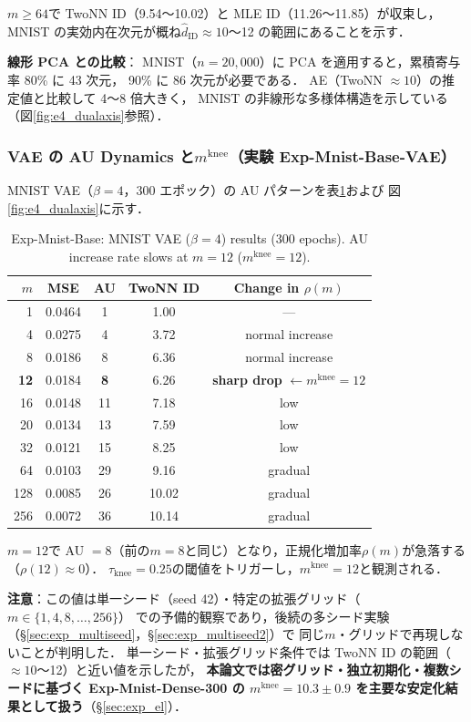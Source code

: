 \documentclass[11pt,a4paper]{jsarticle}
\newcommand{\mknee}{m^{\mathrm{knee}}}
\begin{document}
$m \geq 64$で TwoNN ID（9.54〜10.02）と MLE ID（11.26〜11.85）が収束し，
MNIST の実効内在次元が概ね$\hat{d}_\mathrm{ID} \approx 10$〜12 の範囲にあることを示す．

\textbf{線形 PCA との比較}：
MNIST（$n = 20{,}000$）に PCA を適用すると，累積寄与率 80\% に 43 次元，
90\% に 86 次元が必要である．
AE（TwoNN $\approx 10$）の推定値と比較して 4〜8 倍大きく，
MNIST の非線形な多様体構造を示している（図\ref{fig:e4_dualaxis}参照）．

\subsubsection{VAE の AU Dynamics と$\mknee$（実験 Exp-Mnist-Base-VAE）}

MNIST VAE（$\beta = 4$，300 エポック）の AU パターンを表\ref{tab:e4_vae}および
図\ref{fig:e4_dualaxis}に示す．

\begin{table}[H]
\centering
\caption{Exp-Mnist-Base: MNIST VAE ($\beta=4$) results (300 epochs). AU increase rate slows at $m=12$ ($\mknee=12$).}
\label{tab:e4_vae}
\small
\begin{tabular}{rcccc}
\toprule
$m$ & MSE & AU & TwoNN ID & Change in $\rho(m)$ \\
\midrule
1   & 0.0464 & 1  & 1.00 & --- \\
4   & 0.0275 & 4  & 3.72 & normal increase \\
8   & 0.0186 & 8  & 6.36 & normal increase \\
\textbf{12} & 0.0184 & \textbf{8}  & 6.26 & \textbf{sharp drop} $\leftarrow \mknee = 12$ \\
16  & 0.0148 & 11 & 7.18 & low \\
20  & 0.0134 & 13 & 7.59 & low \\
32  & 0.0121 & 15 & 8.25 & low \\
64  & 0.0103 & 29 & 9.16 & gradual \\
128 & 0.0085 & 26 & 10.02 & gradual \\
256 & 0.0072 & 36 & 10.14 & gradual \\
\bottomrule
\end{tabular}
\end{table}

$m = 12$で AU $= 8$（前の$m = 8$と同じ）となり，正規化増加率$\rho(m)$が急落する（$\rho(12) \approx 0$）．
$\tau_{\mathrm{knee}} = 0.25$の閾値をトリガーし，$\mknee = 12$と観測される．

\textbf{注意}：この値は単一シード（seed 42）・特定の拡張グリッド（$m \in \{1,4,8,\ldots,256\}$）
での予備的観察であり，後続の多シード実験（§\ref{sec:exp_multiseed}，§\ref{sec:exp_multiseed2}）で
同じ$m$・グリッドで再現しないことが判明した．
単一シード・拡張グリッド条件では TwoNN ID の範囲（$\approx 10$〜12）と近い値を示したが，
\textbf{本論文では密グリッド・独立初期化・複数シードに基づく Exp-Mnist-Dense-300 の
$\mknee = 10.3 \pm 0.9$ を主要な安定化結果として扱う}（§\ref{sec:exp_el}）．
\end{document}
